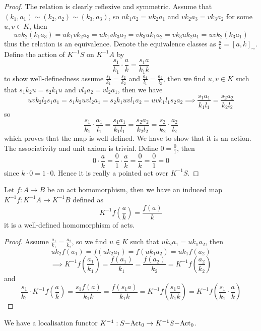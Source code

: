 \begin{proof}[Proof]
    The relation is clearly reflexive and symmetric. Assume 
    that $(k_1,a_1)\sim(k_2,a_2)\sim(k_3,a_3)$, so 
    $uk_1a_2 = uk_2a_1$ and $vk_2a_3 = vk_3a_2$ for some $u,v\in K$, then 
    \[
        uvk_2(k_1a_3) = uk_1vk_2a_3 = uk_1vk_3a_2 = vk_3uk_1a_2 = vk_3uk_2a_1 = uvk_2(k_3a_1)
    \] 
    thus the relation is an equivalence. Denote the equivalence classes as $\frac{a}{k} = [a,k]_\sim$. 
    Define the action of $K^{-1}S$ on $K^{-1}A$ by 
    \[
        \frac{s_1}{k_1}\cdot\frac{a}{k} = \frac{s_1 a}{k_1 k}
    \]
    to show well-definedness assume $\frac{s_1}{k_1}=\frac{s_2}{k_2}$ and $\frac{a_1}{l_1}=\frac{a_2}{l_2}$, then 
    we find $u,v\in K$ such that $s_1k_2u = s_2k_1u$ and $vl_1a_2 = vl_2a_1$, then we have 
    \[
        uvk_2l_2s_1a_1 = s_1k_2uvl_2a_1 = s_2k_1uvl_1a_2 = uvk_1l_1s_2a_2 \implies \frac{s_1a_1}{k_1l_1} = \frac{s_2a_2}{k_2l_2}
    \]
    so 
    \[
        \frac{s_1}{k_1}\cdot\frac{a_1}{l_1} = \frac{s_1a_1}{k_1l_1} = \frac{s_2a_2}{k_2l_2} = \frac{s_2}{k_2}\cdot\frac{a_2}{l_2}
    \]
    which proves that the map is well defined. We have to show that it is an action. 
    The associativity and unit axiom is trivial. Define $0 = \frac{0}{1}$, then 
    \[
        0\cdot\frac{a}{k} = \frac{0}{1}\cdot \frac{a}{k} = \frac{0}{k} = \frac{0}{1} = 0
    \]
    since $k\cdot 0 = 1\cdot 0$. Hence it is really a pointed act over $K^{-1}S$. 
\end{proof}
\begin{proposition}
    Let $f: A\to B$ be an act homomorphism, then we have an induced 
    map $K^{-1}f : K^{-1}A \to K^{-1}B$ defined as 
    \[
        K^{-1}f\left(\frac{a}{k}\right) = \frac{f(a)}{k}
    \] 
    it is a well-defined homomorphism of acts.
\end{proposition}
\begin{proof}[Proof]
    Assume $\frac{a_1}{k_1}=\frac{a_2}{k_2}$, so we find $u\in K$ such that 
    $uk_2a_1= uk_1a_2$, then 
    \[
        uk_2f(a_1) = f(uk_2a_1) = f(uk_1a_2) = uk_1f(a_2)\] 
        \[ \implies K^{-1}f\left(\frac{a_1}{k_1}\right)=\frac{f(a_1)}{k_1}=\frac{f(a_2)}{k_2} = K^{-1}f\left(\frac{a_2}{k_2}\right)
    \]
    and 
    \[
    \frac{s_1}{k_1}\cdot K^{-1}f\left(\frac{a}{k}\right) = \frac{s_1f(a)}{k_1k} = \frac{f(s_1a)}{k_1k} = 
    K^{-1}f\left(\frac{s_1a}{k_1k}\right) = K^{-1}f\left(\frac{s_1}{k_1}\cdot\frac{a}{k}\right)
    \]
\end{proof}
\begin{proposition}
    We have a localisation functor $K^{-1}:S\mathrm{-Act}_0\to K^{-1}S\mathrm{-Act}_0$.
\end{proposition}
